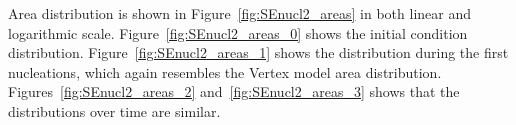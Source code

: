 Area distribution is shown in Figure~\ref{fig:SEnucl2_areas} in both linear and logarithmic scale.  Figure~\ref{fig:SEnucl2_areas_0} shows the initial condition distribution. Figure~\ref{fig:SEnucl2_areas_1} shows the distribution during the first nucleations, which again resembles the Vertex model area distribution. Figures~\ref{fig:SEnucl2_areas_2} and~\ref{fig:SEnucl2_areas_3} shows that the distributions over time are similar.

\begin{figure}[ht]
    \vspace{-1em}
    \centering
    \\
    \\%
\end{figure}
